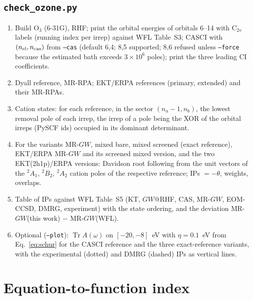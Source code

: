 \documentclass[11pt,a4paper]{article}
\newcommand{\code}[1]{\texttt{#1}}
\begin{document}
\subsection{\code{check\_ozone.py}}

\begin{enumerate}[leftmargin=2em]
\item Build O$_3$ (6-31G), RHF; print the orbital energies of orbitals
  6--14 with C$_{2v}$ labels (running index per irrep) against WFL Table~S3;
  CASCI with $(n_{\rm el},n_{\rm cas})$ from \code{--cas} (default 6,4;
  8,5 supported; 8,6 refused unless \code{--force} because the estimated
  bath exceeds $3\times10^{6}$ poles); print the three leading CI
  coefficients.
\item Dyall reference, MR-RPA; EKT/ERPA references (primary, extended) and
  their MR-RPAs.
\item Cation states: for each reference, in the sector $(n_a-1,n_b)$, the
  lowest removal pole of each irrep, the irrep of a pole being the XOR of
  the orbital irreps (PySCF ids) occupied in its dominant determinant.
\item For the variants MR-$GW$, mixed bare, mixed screened (exact
  reference), EKT/ERPA MR-$GW$ and its screened mixed version, and the two
  EKT(2h1p)/ERPA versions: Davidson root following from the unit vectors of
  the $^2A_1$, $^2B_2$, $^2A_2$ cation poles of the respective reference;
  IPs $=-\theta$, weights, overlaps.
\item Table of IPs against WFL Table~S5 (KT, $GW$@RHF, CAS, MR-$GW$,
  EOM-CCSD, DMRG, experiment) with the state ordering, and the deviation
  MR-$GW$(this work) $-$ MR-$GW$(WFL).
\item Optional (\code{--plot}): $\operatorname{Tr}A(\omega)$ on
  $[-20,-8]$~eV with $\eta=0.1$~eV from Eq.~\eqref{eq:schur} for the CASCI
  reference and the three exact-reference variants, with the experimental
  (dotted) and DMRG (dashed) IPs as vertical lines.
\end{enumerate}

\section{Equation-to-function index}
\label{sec:index}
\end{document}
